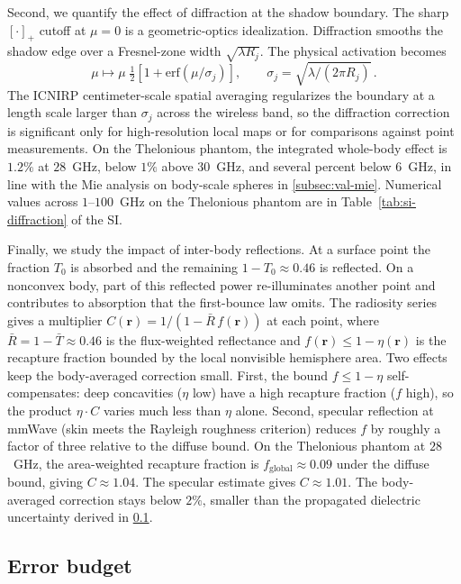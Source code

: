 \documentclass[journal,twocolumn,10pt]{IEEEtran}
\theoremstyle{plain}
\newcommand{\rr}{\mathbf{r}}
\newcommand{\Tbar}{\bar{T}}
\begin{document}
Second, we quantify the effect of diffraction at the shadow boundary.
The sharp $[\cdot]_+$ cutoff at $\mu = 0$ is a geometric-optics
idealization. Diffraction smooths the shadow edge over a Fresnel-zone
width $\sqrt{\lambda R_j}$. The physical activation becomes
\begin{equation}\label{eq:gelu}
  \mu \mapsto \mu\;\tfrac{1}{2}\!\left[1 + \mathrm{erf}(\mu/\sigma_j)\right],
  \qquad \sigma_j = \sqrt{\lambda / (2\pi R_j)}\, .
\end{equation}
The \gls{ICNIRP} centimeter-scale spatial
averaging regularizes the boundary at a length scale larger
than $\sigma_j$ across the wireless band, so the diffraction
correction is significant only for high-resolution local maps or
for comparisons against point measurements. On the Thelonious phantom, the integrated whole-body effect is
$1.2\%$ at $28$~GHz, below $1\%$ above $30$~GHz, and several percent
below $6$~GHz, in line with the Mie analysis on body-scale spheres in
\cref{subsec:val-mie}. Numerical values across $1$--$100$~GHz on
the Thelonious phantom are in Table~\ref{tab:si-diffraction} of the SI.

Finally, we study the impact of inter-body reflections. At a surface
point the fraction $T_0$ is absorbed and the remaining
$1 - T_0 \approx 0.46$ is reflected. On a nonconvex body, part of
this reflected power re-illuminates another point and contributes
to absorption that the first-bounce law omits. The radiosity series
gives a multiplier $C(\rr) = 1/(1 - \bar{R}\,f(\rr))$ at each point,
where $\bar{R} = 1 - \Tbar \approx 0.46$ is the flux-weighted
reflectance and $f(\rr) \le 1 - \eta(\rr)$ is the recapture fraction
bounded by the local nonvisible hemisphere area. Two effects keep the
body-averaged correction small. First, the bound $f \le 1 - \eta$
self-compensates: deep concavities ($\eta$ low) have a high recapture
fraction ($f$ high), so the product $\eta\cdot C$ varies much less
than $\eta$ alone. Second, specular reflection at mmWave (skin meets
the Rayleigh roughness criterion) reduces $f$ by roughly a factor of
three relative to the diffuse bound. On the Thelonious phantom at
$28$~GHz, the area-weighted recapture fraction is
$f_{\mathrm{global}} \approx 0.09$ under the diffuse bound, giving
$C \approx 1.04$. The specular estimate gives $C \approx 1.01$. The
body-averaged correction stays below $2\%$, smaller than the
propagated dielectric uncertainty derived in
\cref{subsec:corr-summary}.

\subsection{Error budget}\label{subsec:corr-summary}
\end{document}
